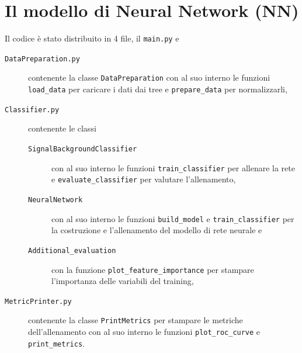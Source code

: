 \newpage

\section{Il modello di Neural Network (NN)}
    Il codice è stato distribuito in 4 file, il \texttt{main.py} e
    \begin{description}
        \item[\texttt{DataPreparation.py}] contenente la classe \texttt{DataPreparation} con al suo interno le funzioni \texttt{load\_data} per caricare i dati dai tree e \texttt{prepare\_data} per normalizzarli,

        \item[\texttt{Classifier.py}] contenente le classi
        \begin{description}
            \item[\texttt{SignalBackgroundClassifier}] con al suo interno le funzioni \texttt{train\_classifier} per allenare la rete e \texttt{evaluate\_classifier} per valutare l'allenamento,

            \item[\texttt{NeuralNetwork}] con al suo interno le funzioni \texttt{build\_model} e \texttt{train\_classifier} per la costruzione e l'allenamento del modello di rete neurale e

            \item[\texttt{Additional\_evaluation}] con la funzione \texttt{plot\_feature\_importance} per stampare l'importanza delle variabili del training,
        \end{description}
        
        \item[\texttt{MetricPrinter.py}] contenente la classe \texttt{PrintMetrics} per stampare le metriche dell'allenamento con al suo interno le funzioni \texttt{plot\_roc\_curve} e \texttt{print\_metrics}.
    \end{description}
    
